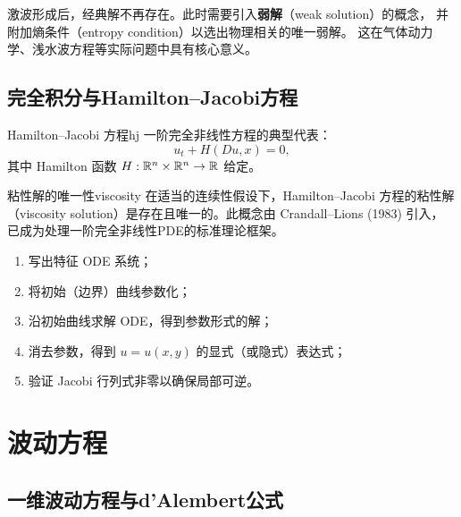 \documentclass[11pt,a4paper,openany,oneside]{ctexbook}
\begin{document}
\begin{remarkbox}
  激波形成后，经典解不再存在。此时需要引入\textbf{弱解}（weak solution）的概念，
  并附加熵条件（entropy condition）以选出物理相关的唯一弱解。
  这在气体动力学、浅水波方程等实际问题中具有核心意义。
\end{remarkbox}

\section{完全积分与Hamilton--Jacobi方程}

\begin{definition}{Hamilton--Jacobi 方程}{hj}
  一阶完全非线性方程的典型代表：
  $$
  u_{t} + H(Du, x) = 0,
  $$
  其中 Hamilton 函数 $H:\mathbb{R}^{n}\times\mathbb{R}^{n}\to\mathbb{R}$ 给定。
\end{definition}

\begin{theorem}{粘性解的唯一性}{viscosity}
  在适当的连续性假设下，Hamilton--Jacobi 方程的粘性解
  （viscosity solution）是存在且唯一的。此概念由 Crandall--Lions (1983) 引入，
  已成为处理一阶完全非线性PDE的标准理论框架。
\end{theorem}

\begin{methodbox}[特征线法求解步骤]
  \begin{enumerate}[label=\textbf{\sffamily\small 步骤 \arabic*.}, leftmargin=*]
    \item 写出特征 ODE 系统；
    \item 将初始（边界）曲线参数化；
    \item 沿初始曲线求解 ODE，得到参数形式的解；
    \item 消去参数，得到 $u=u(x,y)$ 的显式（或隐式）表达式；
    \item 验证 Jacobi 行列式非零以确保局部可逆。
  \end{enumerate}
\end{methodbox}

\newpage

\chapter{波动方程}

\section{一维波动方程与d'Alembert公式}
\end{document}
